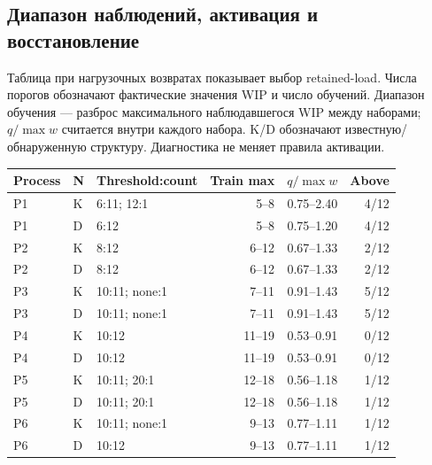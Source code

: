 \clearpage

\subsection{Диапазон наблюдений, активация и восстановление}

Таблица при нагрузочных возвратах показывает выбор retained-load. Числа порогов обозначают фактические значения WIP и число обучений. Диапазон обучения — разброс максимального наблюдавшегося WIP между наборами; $q/\max w$ считается внутри каждого набора. K/D обозначают известную/обнаруженную структуру. Диагностика не меняет правила активации.

\begin{center}\small\setlength{\tabcolsep}{3pt}\begin{tabular}{llp{}rrr}\toprule

Process & N & Threshold:count & Train max & $q/\max w$ & Above\\\midrule

P1 & K & 6:11; 12:1 & 5--8 & 0.75--2.40 & 4/12\\

P1 & D & 6:12 & 5--8 & 0.75--1.20 & 4/12\\

P2 & K & 8:12 & 6--12 & 0.67--1.33 & 2/12\\

P2 & D & 8:12 & 6--12 & 0.67--1.33 & 2/12\\

P3 & K & 10:11; none:1 & 7--11 & 0.91--1.43 & 5/12\\

P3 & D & 10:11; none:1 & 7--11 & 0.91--1.43 & 5/12\\

P4 & K & 10:12 & 11--19 & 0.53--0.91 & 0/12\\

P4 & D & 10:12 & 11--19 & 0.53--0.91 & 0/12\\

P5 & K & 10:11; 20:1 & 12--18 & 0.56--1.18 & 1/12\\

P5 & D & 10:11; 20:1 & 12--18 & 0.56--1.18 & 1/12\\

P6 & K & 10:11; none:1 & 9--13 & 0.77--1.11 & 1/12\\

P6 & D & 10:12 & 9--13 & 0.77--1.11 & 1/12\\

\bottomrule\end{tabular}\end{center}

